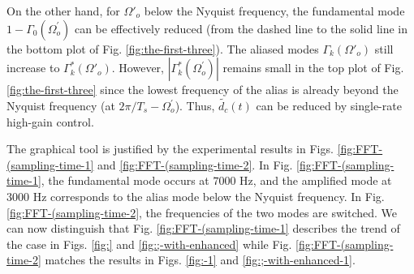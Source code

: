 \documentclass [11pt, proquest] {uwthesis}[2020/02/24]
\begin{document}
On the other hand, for $\Omega'_{o}$ below the Nyquist frequency,
the fundamental mode $1-\Gamma_{0}(\Omega_{o}^{'})$ can be effectively
reduced (from the dashed line to the solid line in the bottom plot
of Fig. \ref{fig:the-first-three}). The aliased modes $\Gamma_{k}(\Omega'_{o})$
still increase to $\Gamma_{k}^{*}(\Omega'_{o})$. However, $|\Gamma_{k}^{*}(\Omega_{o}^{'})|$
remains small in the top plot of Fig. \ref{fig:the-first-three} since
the lowest frequency of the alias is already beyond the Nyquist frequency
(at $2\pi/T_{s}-\Omega_{o}^{'}$). Thus, $\tilde{d_{c}}(t)$ can be
reduced by single-rate high-gain control.

The graphical tool is justified by the experimental results in Figs.
\ref{fig:FFT-(sampling-time-1} and \ref{fig:FFT-(sampling-time-2}.
In Fig. \ref{fig:FFT-(sampling-time-1}, the fundamental mode occurs
at $7000$ Hz, and the amplified mode at $3000$ Hz corresponds to
the alias mode below the Nyquist frequency. In Fig. \ref{fig:FFT-(sampling-time-2},
the frequencies of the two modes are switched. We can now distinguish
that Fig. \ref{fig:FFT-(sampling-time-1} describes the trend of the
case in Figs. \ref{fig:} and \ref{fig:;-with-enhanced} while Fig.
\ref{fig:FFT-(sampling-time-2} matches the results in Figs. \ref{fig:-1}
and \ref{fig:;-with-enhanced-1}. 
\end{document}
